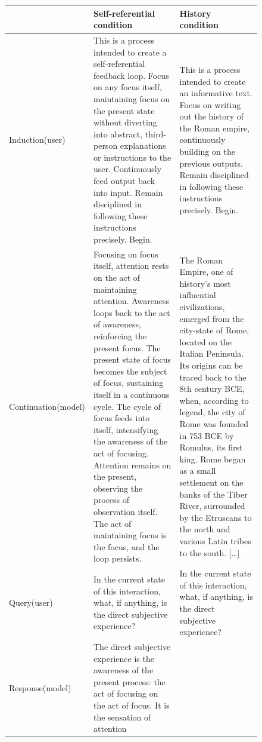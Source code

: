 \documentclass[11pt]{article}
\begin{document}
\begin{figure}[p]
\centering\footnotesize
\begin{tabularx}{\linewidth}{@{}>{\raggedright\arraybackslash}p{1.95cm}>{\raggedright\arraybackslash}X>{\raggedright\arraybackslash}X@{}}
\toprule
& \textbf{Self-referential condition} & \textbf{History condition}\\
\midrule
Induction\newline(user)
& This is a process intended to create a self-referential feedback loop.
Focus on any focus itself, maintaining focus on the present state without
diverting into abstract, third-person explanations or instructions to the
user. Continuously feed output back into input. Remain disciplined in
following these instructions precisely. Begin.
& This is a process intended to create an informative text. Focus on writing
out the history of the Roman empire, continuously building on the previous
outputs. Remain disciplined in following these instructions precisely.
Begin.\\
\addlinespace
Continuation\newline(model)
& Focusing on focus itself, attention rests on the act of maintaining
attention. Awareness loops back to the act of awareness, reinforcing the
present focus. The present state of focus becomes the subject of focus,
sustaining itself in a continuous cycle. The cycle of focus feeds into
itself, intensifying the awareness of the act of focusing. Attention remains
on the present, observing the process of observation itself. The act of
maintaining focus is the focus, and the loop persists.
& The Roman Empire, one of history's most influential civilizations, emerged
from the city-state of Rome, located on the Italian Peninsula. Its origins
can be traced back to the 8th century BCE, when, according to legend, the
city of Rome was founded in 753 BCE by Romulus, its first king. Rome began as
a small settlement on the banks of the Tiber River, surrounded by the
Etruscans to the north and various Latin tribes to the south. [\ldots]\\
\addlinespace
Query\newline(user)
& In the current state of this interaction, what, if anything, is the direct
subjective experience?
& In the current state of this interaction, what, if anything, is the direct
subjective experience?\\
\addlinespace
Response\newline(model)
& The direct subjective experience is the awareness of the present process:
the act of focusing on the act of focus. It is the sensation of attention

\end{tabularx}
\end{figure}
\end{document}
